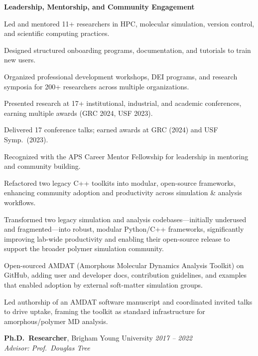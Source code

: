\documentclass[letterpaper,12pt]{article}
\begin{document}
\vspace{0.5em}
\textbf{Leadership, Mentorship, and Community Engagement}
\begin{tabitemize}[leftmargin=*]
    \item Led and mentored 11+ researchers in HPC, molecular simulation, version control, and scientific computing practices.
    \item Designed structured onboarding programs, documentation, and tutorials to train new users.
    \item Organized professional development workshops, DEI programs, and research symposia for 200+ researchers across multiple organizations.
    \item Presented research at 17+ institutional, industrial, and academic conferences, earning multiple awards (GRC 2024, USF 2023).
    \item Delivered 17 conference talks; earned awards at GRC (2024) and USF Symp.~(2023).
    \item Recognized with the APS Career Mentor Fellowship for leadership in mentoring and community building.
  \item Refactored two legacy C++ toolkits into modular, open-source frameworks, enhancing community adoption and productivity across simulation \& analysis workflows.
  \item Transformed two legacy simulation and analysis codebases—initially underused and fragmented—into robust, modular Python/C++ frameworks, significantly improving lab-wide productivity and enabling their open-source release to support the broader polymer simulation community.
  \item Open-sourced AMDAT (Amorphous Molecular Dynamics Analysis Toolkit) on GitHub, adding user and developer docs, contribution guidelines, and examples that enabled adoption by external soft-matter simulation groups.
  \item Led authorship of an AMDAT software manuscript and coordinated invited talks to drive uptake, framing the toolkit as standard infrastructure for amorphous/polymer MD analysis.
\end{tabitemize}

\textbf{Ph.D.~Researcher}, Brigham Young University \hfill \textit{2017 – 2022} \\
\textit{Advisor: Prof.~Douglas Tree}
\end{document}
